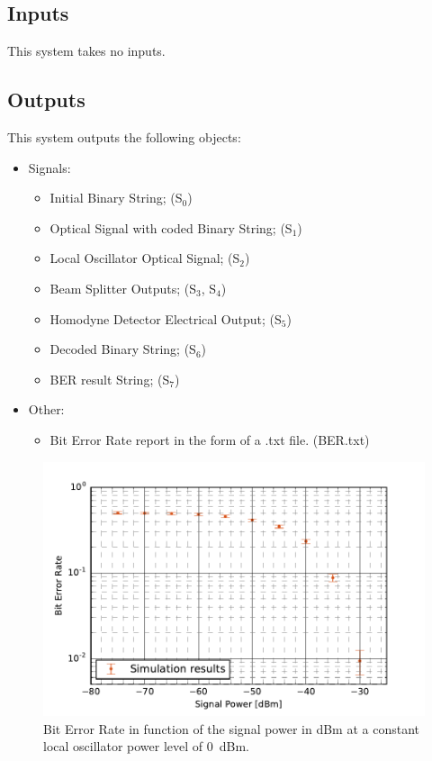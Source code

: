 \subsection*{Inputs}

This system takes no inputs.

\subsection*{Outputs}

This system outputs the following objects:
\begin{itemize}
\item Signals:
\begin{itemize}
\item Initial Binary String; (S$_0$)
\item Optical Signal with coded Binary String; (S$_{1}$)
\item Local Oscillator Optical Signal; (S$_{2}$)
\item Beam Splitter Outputs; (S$_{3}$, S$_{4}$)
\item Homodyne Detector Electrical Output; (S$_{5}$)
\item Decoded Binary String; (S$_{6}$)
\item BER result String; (S$_{7}$)
\end{itemize}
\item Other:
\begin{itemize}
\item Bit Error Rate report in the form of a .txt file. (BER.txt)
\end{itemize}
\end{itemize}

\begin{figure}[H]
\centering
\includegraphics[width=.7\linewidth]{./sdf/bpsk_system/figures/BER_Evolution_simu.pdf}
\caption{Bit Error Rate in function of the signal power in dBm at a constant local oscillator power level of 0~dBm.}
\label{fig:berevolution}
\end{figure}

